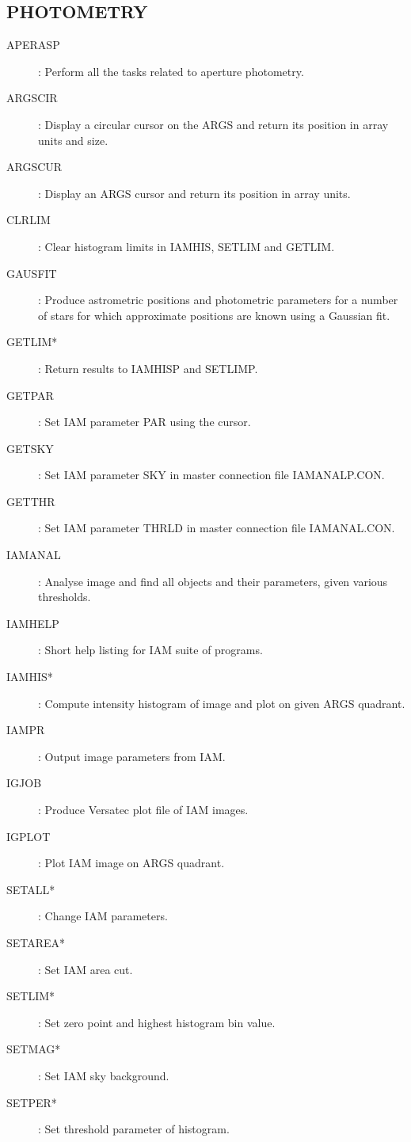 \subsection {PHOTOMETRY}
\begin{description}
\begin{description}
\item [APERASP]: Perform all the tasks related to aperture photometry.
\item [ARGSCIR]: Display a circular cursor on the ARGS and return its position
in array units and size.
\item [ARGSCUR]: Display an ARGS cursor and return its position in array units.
\item [CLRLIM]: Clear histogram limits in IAMHIS, SETLIM and GETLIM.
\item [GAUSFIT]:  Produce astrometric positions and photometric parameters for
a number of stars for which approximate positions are known using a Gaussian
fit.
\item [GETLIM*]: Return results to IAMHISP and SETLIMP.
\item [GETPAR]: Set IAM parameter PAR using the cursor.
\item [GETSKY]: Set IAM parameter SKY in master connection file IAMANALP.CON.
\item [GETTHR]: Set IAM parameter THRLD in master connection file IAMANAL.CON.
\item [IAMANAL]: Analyse image and find all objects and their parameters, given
various thresholds.
\item [IAMHELP]: Short help listing for IAM suite of programs.
\item [IAMHIS*]: Compute intensity histogram of image and plot on given ARGS
quadrant.
\item [IAMPR]: Output image parameters from IAM.
\item [IGJOB]: Produce Versatec plot file of IAM images.
\item [IGPLOT]: Plot IAM image on ARGS quadrant.
\item [SETALL*]:  Change IAM parameters.
\item [SETAREA*]: Set IAM area cut.
\item [SETLIM*]: Set zero point and highest histogram bin value.
\item [SETMAG*]: Set IAM sky background.
\item [SETPER*]: Set threshold parameter of histogram.
\end{description}
\end{description}
